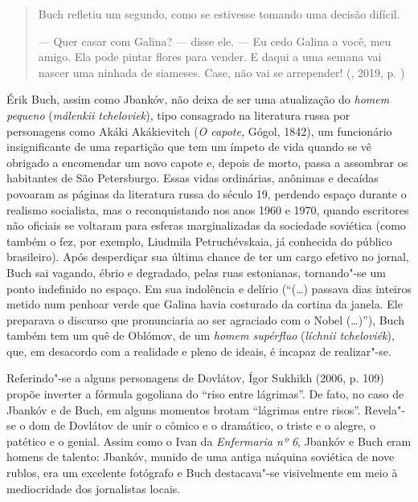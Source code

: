 \begin{quote}
Buch refletiu um segundo, como se estivesse tomando uma decisão difícil.

--- Quer casar com Galina? --- disse ele. --- Eu cedo Galina a você, meu
amigo. Ela pode pintar flores para vender. E daqui a uma semana vai
nascer uma ninhada de siameses. Case, não vai se arrepender! (,
2019, p. \pageref{ref5})
\end{quote}

Érik Buch, assim como Jbankóv, não deixa de ser uma atualização do
\emph{homem pequeno} (\emph{málenkii tcheloviek}), tipo consagrado na
literatura russa por personagens como Akáki Akákievitch (\emph{O
capote,} Gógol, 1842), um funcionário insignificante de uma
repartição que tem um ímpeto de vida quando se vê obrigado a encomendar
um novo capote e, depois de morto, passa a assombrar os habitantes de
São Petersburgo. Essas vidas ordinárias, anônimas e decaídas povoaram as
páginas da literatura russa do século 19, perdendo espaço durante o
realismo socialista, mas o reconquistando nos anos 1960 e 1970, quando
escritores não oficiais se voltaram para esferas marginalizadas da
sociedade soviética (como também o fez, por exemplo, Liudmila
Petruchévskaia, já conhecida do público brasileiro). Após desperdiçar
sua última chance de ter um cargo efetivo no jornal, Buch sai vagando,
ébrio e degradado, pelas ruas estonianas, tornando"-se um ponto
indefinido no espaço. Em sua indolência e delírio (``(\ldots{}) passava dias
inteiros metido num penhoar verde que Galina havia costurado da cortina
da janela. Ele preparava o discurso que pronunciaria ao ser agraciado
com o Nobel (\ldots{})''), Buch também tem um quê de Oblómov, de um
\emph{homem supérfluo} (\emph{líchnii tcheloviék}), que, em desacordo
com a realidade e pleno de ideais, é incapaz de realizar"-se.

Referindo"-se a alguns personagens de Dovlátov, Ígor Sukhikh (2006, p.
109) propõe inverter a fórmula gogoliana do ``riso entre lágrimas''. De
fato, no caso de Jbankóv e de Buch, em alguns momentos brotam ``lágrimas
entre risos''. Revela"-se o dom de Dovlátov de unir o cômico e o
dramático, o triste e o alegre, o patético e o genial. Assim como o Ivan
da \emph{Enfermaria nº 6}, Jbankóv e Buch eram homens de talento:
Jbankóv, munido de uma antiga máquina soviética de nove rublos, era um
excelente fotógrafo e Buch destacava"-se visivelmente em meio à
mediocridade dos jornalistas locais.

